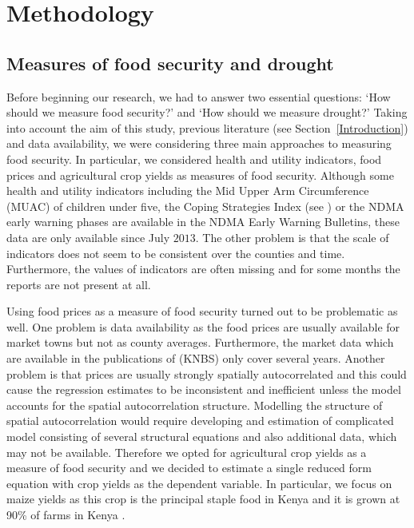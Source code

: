 \documentclass[a4paper,12pt]{article}
\begin{document}
\section{Methodology}\label{Method}

\subsection{Measures of food security and drought}

Before beginning our research, we had to answer two essential %
questions: `How should we measure food security?' and `How should we measure drought?' Taking into account the aim of this study, previous literature (see Section~\ref{Introduction}) and data availability, we were considering three main approaches to measuring food security. In particular, we considered health and utility indicators, food prices and agricultural crop yields as measures of food security. Although some health and utility indicators including the Mid Upper Arm Circumference (MUAC) of children under five, the Coping Strategies Index (see \citealp{CSI}) or the NDMA early warning phases are available in the NDMA Early Warning Bulletins, these data are only available since July $2013$. The other problem is that the scale of indicators does not seem to be consistent over the counties and time. Furthermore, the values of indicators are often missing and for some months the reports are not present at all.

Using food prices as a measure of food security turned out to be problematic as well. 
One problem is data availability as the food prices are usually available for market towns but not as county averages. Furthermore, the market data which are available in the publications of \cite{KNBS} (KNBS) only cover several years. Another problem is that prices are usually strongly spatially autocorrelated and this could cause the regression estimates to be inconsistent and inefficient unless the model accounts for the spatial autocorrelation structure. Modelling the structure of spatial autocorrelation would require developing and estimation of complicated model consisting of several structural equations and also additional data, which may not be available. Therefore we opted for agricultural crop yields as a measure of food security and we decided to estimate a single reduced form equation with crop yields as the dependent variable. In particular, we focus on maize yields as this crop is the principal staple food in Kenya and it is grown at 90\% of farms in Kenya \citep{FAO}.
\end{document}
